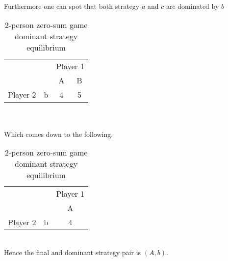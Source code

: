 \documentclass[10pt, a4paper]{report}
\begin{document}
Furthermore one can spot that both strategy $a$ and $c$ are dominated by $b$
\begin{table}[ht!]
	\hspace{-4em}
	\centering
	\begin{tabular}{cccc|}
		& & \multicolumn{2}{c}{Player 1}           \\ \cline{3-4}
		& & A & \multicolumn{1}{c}{B}              \\ \cline{3-4}
		Player 2 & \multicolumn{1}{|c|}{b} & 4 & 5 \\ \cline{3-4}
	\end{tabular}
	\caption{2-person zero-sum game\\ dominant strategy equilibrium}
\end{table}
\\\\
Which comes down to the following.
\begin{table}[ht!]
	\hspace{-4em}
	\centering
	\begin{tabular}{ccc|}
		& & \multicolumn{1}{c}{Player 1}       \\ \cline{3-3}
		& & \multicolumn{1}{c}{A}              \\ \cline{3-3}
		Player 2 & \multicolumn{1}{|c|}{b} & 4 \\ \cline{3-3}
	\end{tabular}
	\caption{2-person zero-sum game\\ dominant strategy equilibrium}
\end{table}
\\
Hence the final and dominant strategy pair is $(A,b)$.

\end{document}
